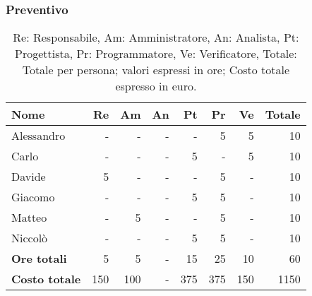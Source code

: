 \subsubsection{Preventivo}

\begin{table}[H]
	\centering
	\begin{tabular}{l|r|r|r|r|r|r|r}
		\textbf{Nome}         & \textbf{Re} & \textbf{Am} & \textbf{An} & \textbf{Pt} & \textbf{Pr} & \textbf{Ve} & \textbf{Totale} \\
		\hline
		Alessandro            & -           & -           & -           & -           & 5           & 5           & 10              \\
		Carlo                 & -           & -           & -           & 5           & -           & 5           & 10              \\
		Davide                & 5           & -           & -           & -           & 5           & -           & 10              \\
		Giacomo               & -           & -           & -           & 5           & 5           & -           & 10              \\
		Matteo                & -           & 5           & -           & -           & 5           & -           & 10              \\
		Niccolò               & -           & -           & -           & 5           & 5           & -           & 10              \\
		\hline
		\textbf{Ore totali}   & 5           & 5           & -           & 15          & 25          & 10          & 60              \\
		\textbf{Costo totale} & 150         & 100         & -           & 375         & 375         & 150         & 1150
	\end{tabular}
	\caption{Re: Responsabile, Am: Amministratore, An: Analista, Pt: Progettista,
		Pr: Programmatore, Ve: Verificatore, Totale: Totale per persona; valori espressi in ore; Costo totale espresso in euro.}
\end{table}

